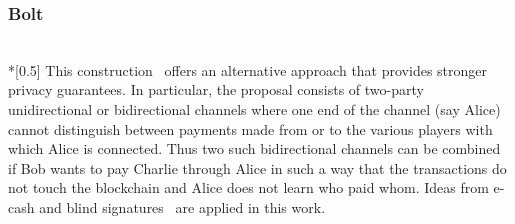 \subsubsection{Bolt} \ \\*[0.5\baselineskip]
  This construction~\cite{bolt} offers an alternative approach that provides stronger
  privacy guarantees. In particular, the proposal consists of two-party unidirectional or
  bidirectional channels where one end of the channel (say Alice) cannot distinguish
  between payments made from or to the various players with which Alice is connected. Thus
  two such bidirectional channels can be combined if Bob wants to pay Charlie through
  Alice in such a way that the transactions do not touch the blockchain and Alice does not
  learn who paid whom. Ideas from e-cash and blind signatures~\cite{blindsignatures} are
  applied in this work.
